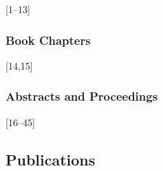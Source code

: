 \documentclass[
]{article}
\begin{document}
{[}1--13{]}

\hypertarget{book-chapters}{%
\subsubsection{Book Chapters}\label{book-chapters}}

{[}14,15{]}

\hypertarget{abstracts-and-proceedings}{%
\subsubsection{Abstracts and
Proceedings}\label{abstracts-and-proceedings}}

{[}16--45{]}

\hypertarget{publications}{%
\subsection*{Publications}\label{publications}}
\end{document}
